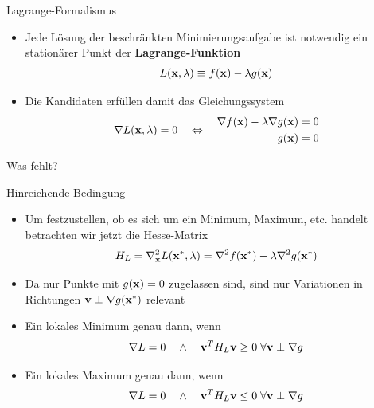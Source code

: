 \begin{frame}{Lagrange-Formalismus}
  \begin{itemize}
  \item Jede Lösung der beschränkten Minimierungsaufgabe ist notwendig
    ein stationärer Punkt der \textbf{Lagrange-Funktion}
    \begin{gather*}
      L(\mathbf{x},\lambda) \equiv f(\mathbf{x}) - \lambda g(\mathbf{x})
    \end{gather*}
  \item Die Kandidaten erfüllen damit das Gleichungssystem
    \begin{gather*}
      \nabla L(\mathbf{x},\lambda) = 0
      \quad\Leftrightarrow\quad
      \begin{aligned}
        \nabla f(\mathbf{x}) - \lambda \nabla g(\mathbf{x}) &= 0\\
        -g(\mathbf{x}) &=0
      \end{aligned}
    \end{gather*}
  \end{itemize}
  \pause
  \begin{Denkpause}
    Was fehlt?
  \end{Denkpause}
\end{frame}

\begin{frame}{Hinreichende Bedingung}
  \begin{itemize}
  \item Um festzustellen, ob es sich um ein Minimum, Maximum,
    etc. handelt betrachten wir jetzt die Hesse-Matrix
    \begin{gather*}
       H_{L}=\nabla^2_{\mathbf{x}} L(\mathbf{x}^*,\lambda) = \nabla^2f(\mathbf{x}^*) - \lambda \nabla^2 g(\mathbf{x}^*)
    \end{gather*}
  \item Da nur Punkte mit $g(\mathbf{x})=0$ zugelassen sind, sind nur
    Variationen in Richtungen $\mathbf{v}\perp\nabla g(\mathbf{x}^*)$ relevant
  \item Ein lokales Minimum genau dann, wenn
    \begin{gather*}
      \nabla L = 0 \quad \wedge \quad
      \mathbf{v}^TH_{L}\mathbf{v} \ge 0 \;\forall \mathbf{v}\perp\nabla g
    \end{gather*}
  \item Ein lokales Maximum genau dann, wenn
    \begin{gather*}
      \nabla L = 0 \quad \wedge \quad
      \mathbf{v}^TH_{L}\mathbf{v} \le 0 \;\forall \mathbf{v}\perp\nabla g
    \end{gather*}
  \end{itemize}
\end{frame}

